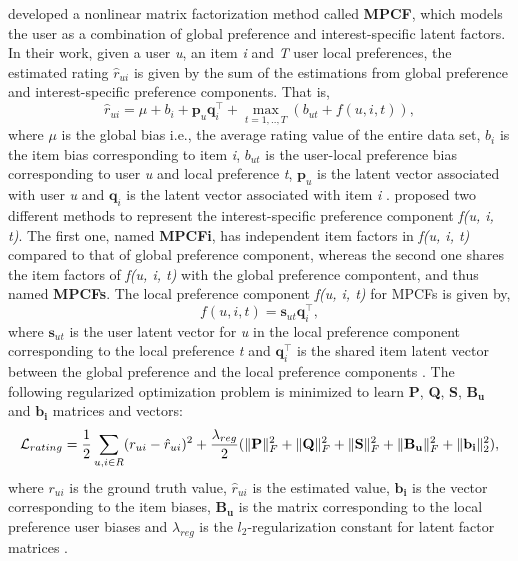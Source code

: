 \cite{Kabbur2015} developed a nonlinear matrix factorization method called \textbf{MPCF}, which models the user as a combination of global preference and interest-specific latent factors.
In their work, given a user \textit{u}, an item \textit{i} and \textit{T} user local preferences, the estimated rating \textit{$\hat{r}_{ui}$} is given by the sum of the estimations from global preference and interest-specific preference components.
That is,
\begin{equation}
\hat{r}_{ui} = \mu + b_i + \textbf{p}_u \textbf{q}_i^\intercal + \max_{t=1,..,T} (b_{ut} + f(u, i, t)),
\end{equation}
where $\mu$ is the global bias i.e., the average rating value of the entire data set, $b_i$ is the item bias corresponding to item \textit{i}, $b_{ut}$ is the user-local preference bias corresponding to user \textit{u} and local preference \textit{t}, $\textbf{p}_u$ is the latent vector associated with user \textit{u} and $\textbf{q}_i$ is the latent vector associated with item \textit{i} \cite{Kabbur2015}.
\cite{Kabbur2015} proposed two different methods to represent the interest-specific preference component \textit{f(u, i, t)}.
The first one, named \textbf{MPCFi}, has independent item factors in \textit{f(u, i, t)} compared to that of global preference component, whereas the second one shares the item factors of \textit{f(u, i, t)} with the global preference compontent, and thus named \textbf{MPCFs}.
The local preference component \textit{f(u, i, t)} for MPCFs is given by,
\begin{equation}
f(u, i, t) = \textbf{s}_{ut} \textbf{q}_i^\intercal,
\end{equation}
where $\textbf{s}_{ut}$ is the user latent vector for \textit{u} in the local preference component corresponding to the local preference \textit{t} and $\textbf{q}_i^\intercal$ is the shared item latent vector between the global preference and the local preference components \cite{Kabbur2015}.
The following regularized optimization problem is minimized to learn \textbf{P}, \textbf{Q}, \textbf{S}, $\mathbf{B_u}$ and $\mathbf{b_i}$ matrices and vectors:
\begin{equation}
\mathcal{L}_{rating} = \frac{1}{2} \sum_{u,i \in R} (r_{ui} - \hat{r}_{ui})^2 + \frac{\lambda_{reg}}{2} (\lVert{\ensuremath{\mathbf{P}}}\rVert_F^2 + \lVert{\ensuremath{\mathbf{Q}}}\rVert_F^2 + \lVert{\ensuremath{\mathbf{S}}}\rVert_F^2 + \lVert{\ensuremath{\mathbf{B_u}}}\rVert_F^2 + \lVert{\ensuremath{\mathbf{b_i}}}\rVert_2^2),\label{eq:mpcf-rating}
\end{equation}
where $r_{ui}$ is the ground truth value,  $\hat{r}_{ui}$ is the estimated value, $\mathbf{b_i}$ is the vector corresponding to the item biases, $\mathbf{B_u}$ is the matrix corresponding to the local preference user biases and $\lambda_{reg}$ is the $l_2$-regularization constant for latent factor matrices \cite{Kabbur2015}.


